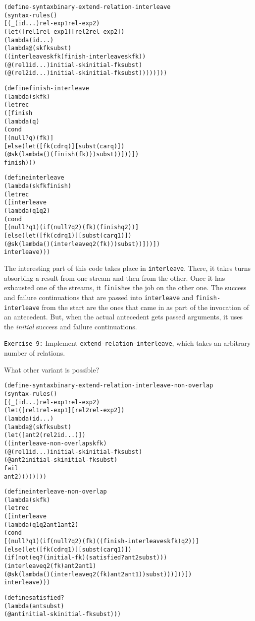 \begin{alltt}
(define-syntax binary-extend-relation-interleave
  (syntax-rules ()
    [(_ (id ...) rel-exp1 rel-exp2)
     (let ([rel1 rel-exp1] [rel2 rel-exp2])
       (lambda (id ...)
         (lambda@ (sk fk subst)
           ((interleave sk fk (finish-interleave sk fk))
            (@ (rel1 id ...) initial-sk initial-fk subst)
            (@ (rel2 id ...) initial-sk initial-fk subst)))))]))

(define finish-interleave
  (lambda (sk fk)
    (letrec
      ([finish
         (lambda (q)
           (cond
             [(null? q) (fk)]
             [else (let ([fk (cdr q)] [subst (car q)])
                     (@ sk (lambda () (finish (fk))) subst))]))])
      finish)))

(define interleave
  (lambda (sk fk finish)
    (letrec
      ([interleave
         (lambda (q1 q2)
           (cond
             [(null? q1) (if (null? q2) (fk) (finish q2))]
             [else (let ([fk (cdr q1)] [subst (car q1)])
                     (@ sk (lambda () (interleave q2 (fk))) subst))]))])
      interleave)))
\end{alltt}

The interesting part of this code takes place in \texttt{interleave}.
There, it takes turns absorbing a result from one stream and then from
the other.  Once it has exhausted one of the streams, it
\texttt{finish}es the job on the other one.  The success and failure
continuations that are passed into \texttt{interleave} and
\texttt{finish-interleave} from the start are the ones that came in as
part of the invocation of an antecedent.  But, when the actual
antecedent gets passed arguments, it uses the \emph{initial} success
and failure continuations.

\noindent
\texttt{Exercise 9:} Implement \texttt{extend-relation-interleave},
which takes an arbitrary number of relations.\endofexercise

What other variant is possible?

\begin{alltt}
(define-syntax binary-extend-relation-interleave-non-overlap
  (syntax-rules ()
    [(_ (id ...) rel-exp1 rel-exp2)
     (let ([rel1 rel-exp1] [rel2 rel-exp2])
       (lambda (id ...)
         (lambda@ (sk fk subst)
           (let ([ant2 (rel2 id ...)])
             ((interleave-non-overlap sk fk)
              (@ (rel1 id ...) initial-sk initial-fk subst)
              (@ ant2 initial-sk initial-fk subst)
              fail
              ant2)))))]))

(define interleave-non-overlap
  (lambda (sk fk)
    (letrec
      ([interleave
         (lambda (q1 q2 ant1 ant2)
           (cond
             [(null? q1) (if (null? q2) (fk) ((finish-interleave sk fk) q2))]
             [else (let ([fk (cdr q1)] [subst (car q1)])
		(if (not (eq? (initial-fk) (satisfied? ant2 subst)))
		  (interleave q2 (fk) ant2 ant1)
		  (@ sk (lambda () (interleave q2 (fk) ant2 ant1)) subst)))]))])
      interleave)))

(define satisfied?
  (lambda (ant subst)
    (@ ant initial-sk initial-fk subst)))
\end{alltt}

